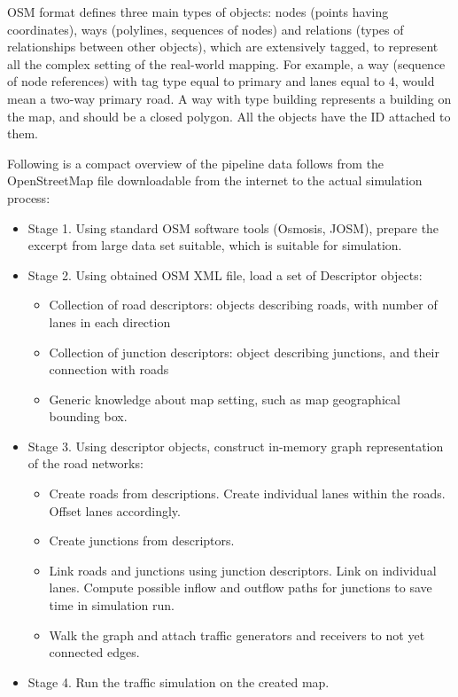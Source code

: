 OSM format defines three main types of objects: nodes (points having coordinates), ways (polylines, sequences of nodes) and relations (types of relationships between other objects), which are extensively tagged, to represent all the complex setting of the real-world mapping. For example, a way (sequence of node references) with tag type equal to primary and lanes equal to 4, would mean a two-way primary road. A way with type building represents a building on the map, and should be a closed polygon. All the objects have the ID attached to them.

Following is a compact overview of the pipeline data follows from the OpenStreetMap file downloadable from the internet to the actual simulation process:
\begin{itemize}
    \item Stage 1. Using standard OSM software tools (Osmosis, JOSM), prepare the excerpt from large data set suitable, which is suitable for simulation.

    \item Stage 2. Using obtained OSM XML file, load a set of Descriptor objects:
    \begin{itemize}
        \item Collection of road descriptors: objects describing roads, with number of lanes in each direction
        \item Collection of junction descriptors: object describing junctions, and their connection with roads
        \item Generic knowledge about map setting, such as map geographical bounding box.
    \end{itemize}

    \item Stage 3. Using descriptor objects, construct in-memory graph representation of the road networks:
    \begin{itemize}
        \item Create roads from descriptions. Create individual lanes within the roads. Offset lanes accordingly.
        \item Create junctions from descriptors.
        \item Link roads and junctions using junction descriptors. Link on individual lanes. Compute possible inflow and outflow paths for junctions to save time in simulation run.
        \item Walk the graph and attach traffic generators and receivers to not yet connected edges.
    \end{itemize}

    \item Stage 4. Run the traffic simulation on the created map.
\end{itemize}


